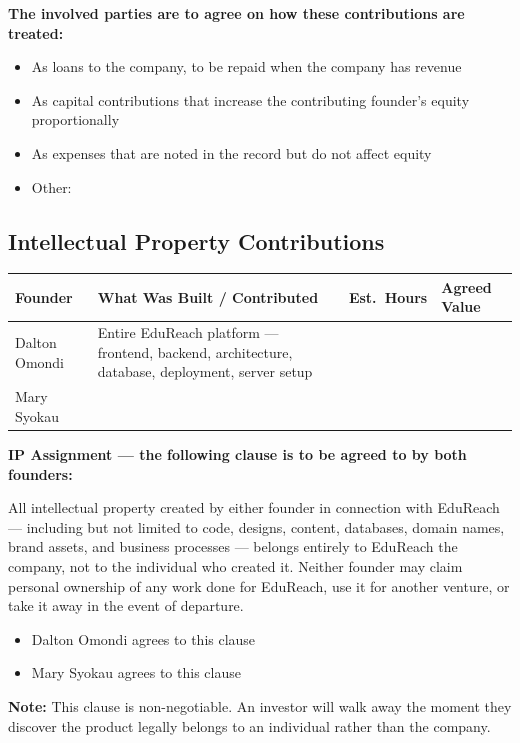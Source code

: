 \documentclass[12pt,a4paper]{article}
\newcommand{\blank}[1][5.5cm]{\underline{\hspace{#1}}}
\newcommand{\cb}{$\square$\;}                   %
\begin{document}
\noindent\textbf{The involved parties are to agree on how these contributions are treated:}

\begin{itemize}[label=\cb]
  \item As loans to the company, to be repaid when the company has revenue
  \item As capital contributions that increase the contributing founder's equity proportionally
  \item As expenses that are noted in the record but do not affect equity
  \item Other: \blank[7cm]
\end{itemize}

\subsection{Intellectual Property Contributions}

\begin{tabularx}{\linewidth}{L{3cm} L{6cm} C{2cm} L{2.5cm}}
  \toprule
  \textbf{Founder} & \textbf{What Was Built / Contributed} & \textbf{Est.\ Hours} & \textbf{Agreed Value} \\
  \midrule
  Dalton Omondi & Entire EduReach platform --- frontend, backend, architecture, database, deployment, server setup & \blank[1cm] & \blank[2cm] \\[0.5em]
  Mary Syokau   & \blank[5.5cm] & \blank[1cm] & \blank[2cm] \\
  \bottomrule
\end{tabularx}

\medskip
\noindent\textbf{IP Assignment --- the following clause is to be agreed to by both founders:}

All intellectual property created by either founder in connection with EduReach --- including but not limited to code, designs, content, databases, domain names, brand assets, and business processes --- belongs entirely to EduReach the company, not to the individual who created it. Neither founder may claim personal ownership of any work done for EduReach, use it for another venture, or take it away in the event of departure.

\begin{itemize}[label=\cb]
  \item Dalton Omondi agrees to this clause
  \item Mary Syokau agrees to this clause
\end{itemize}

\begin{warnbox}
\textbf{Note:} This clause is non-negotiable. An investor will walk away the moment they discover the product legally belongs to an individual rather than the company.
\end{warnbox}
\end{document}
